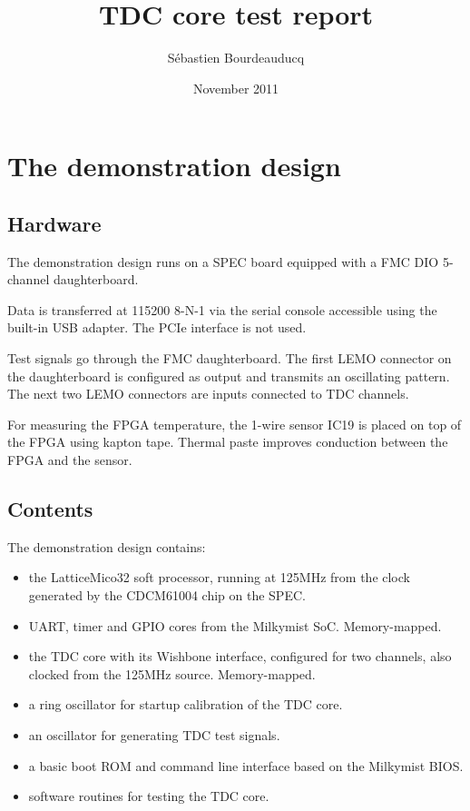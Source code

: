 \documentclass[a4paper,11pt]{article}
\title{TDC core test report}
\author{S\'ebastien Bourdeauducq}
\date{November 2011}
\begin{document}
\setlength{\parindent}{0pt}
\setlength{\parskip}{5pt}
\maketitle{}
\section{The demonstration design}
\subsection{Hardware}
The demonstration design runs on a SPEC board equipped with a FMC DIO 5-channel daughterboard.

Data is transferred at 115200 8-N-1 via the serial console accessible using the built-in USB adapter. The PCIe interface is not used.

Test signals go through the FMC daughterboard. The first LEMO connector on the daughterboard is configured as output and transmits an oscillating pattern. The next two LEMO connectors are inputs connected to TDC channels.

For measuring the FPGA temperature, the 1-wire sensor IC19 is placed on top of the FPGA using kapton tape. Thermal paste improves conduction between the FPGA and the sensor.

\subsection{Contents}
The demonstration design contains:
\begin{itemize}
\item the LatticeMico32 soft processor, running at 125MHz from the clock generated by the CDCM61004 chip on the SPEC.
\item UART, timer and GPIO cores from the Milkymist SoC. Memory-mapped.
\item the TDC core with its Wishbone interface, configured for two channels, also clocked from the 125MHz source. Memory-mapped.
\item a ring oscillator for startup calibration of the TDC core.
\item an oscillator for generating TDC test signals.
\item a basic boot ROM and command line interface based on the Milkymist BIOS.
\item software routines for testing the TDC core.
\end{itemize}
\end{document}
